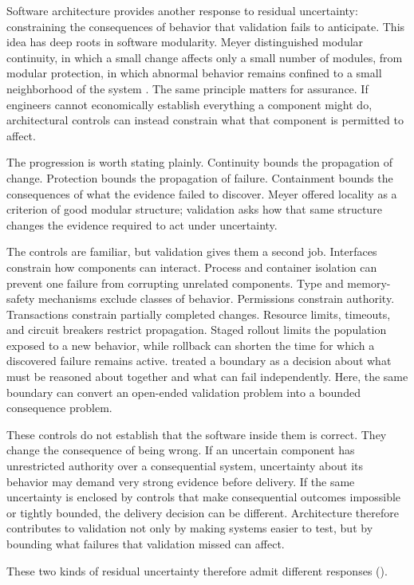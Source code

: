 Software architecture provides another response to residual uncertainty: constraining the
consequences of behavior that validation fails to anticipate. This idea has deep roots in software
modularity. Meyer distinguished modular continuity, in which a small change affects only a small
number of modules, from modular protection, in which abnormal behavior remains confined to a small
neighborhood of the system \citep{meyer1997oosc}. The same principle matters for assurance. If engineers
cannot economically establish everything a component might do, architectural controls can instead
constrain what that component is permitted to affect.

The progression is worth stating plainly. Continuity bounds the propagation of change. Protection
bounds the propagation of failure. Containment bounds the consequences of what the evidence failed
to discover. Meyer offered locality as a criterion of good modular structure; validation asks how
that same structure changes the evidence required to act under uncertainty.

The controls are familiar, but validation gives them a second job. Interfaces constrain how
components can interact. Process and container isolation can prevent one failure from corrupting
unrelated components. Type and memory-safety mechanisms exclude classes of behavior. Permissions
constrain authority. Transactions constrain partially completed changes. Resource limits, timeouts,
and circuit breakers restrict propagation. Staged rollout limits the population exposed to a new
behavior, while rollback can shorten the time for which a discovered failure remains active.
\citet{ch-architecture} treated a boundary as a decision about what must be reasoned about together and
what can fail independently. Here, the same boundary can convert an open-ended validation problem
into a bounded consequence problem.

These controls do not establish that the software inside them is correct. They change the
consequence of being wrong. If an uncertain component has unrestricted authority over a
consequential system, uncertainty about its behavior may demand very strong evidence before
delivery. If the same uncertainty is enclosed by controls that make consequential outcomes
impossible or tightly bounded, the delivery decision can be different. Architecture therefore
contributes to validation not only by making systems easier to test, but by bounding what failures
that validation missed can affect.

These two kinds of residual uncertainty therefore admit different responses
(\citet{tbl-margin-containment}).

